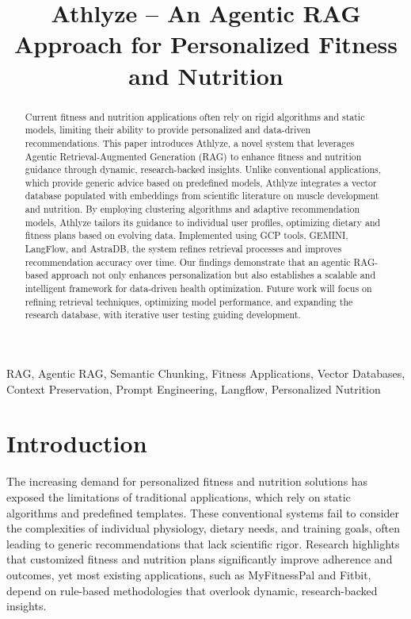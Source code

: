 \documentclass[conference]{IEEEtran}
\title{Athlyze – An Agentic RAG Approach for Personalized Fitness and Nutrition}
\author{
    \IEEEauthorblockN{Nishchay Patel}
    \IEEEauthorblockA{
        Department of Computer Science, \\ 
        Georgia State University,\\
        Atlanta, GA, USA\\
        \href{mailto:npatel237@student.gsu.edu}{npatel237@student.gsu.edu}
    }
}
\begin{document}
\maketitle

\begin{abstract}
Current fitness and nutrition applications often rely on rigid algorithms and static models, limiting their ability to provide personalized and data-driven recommendations. This paper introduces Athlyze, a novel system that leverages Agentic Retrieval-Augmented Generation (RAG) to enhance fitness and nutrition guidance through dynamic, research-backed insights. Unlike conventional applications, which provide generic advice based on predefined models, Athlyze integrates a vector database populated with embeddings from scientific literature on muscle development and nutrition. By employing clustering algorithms and adaptive recommendation models, Athlyze tailors its guidance to individual user profiles, optimizing dietary and fitness plans based on evolving data. Implemented using GCP tools, GEMINI, LangFlow, and AstraDB, the system refines retrieval processes and improves recommendation accuracy over time. Our findings demonstrate that an agentic RAG-based approach not only enhances personalization but also establishes a scalable and intelligent framework for data-driven health optimization. Future work will focus on refining retrieval techniques, optimizing model performance, and expanding the research database, with iterative user testing guiding development.\\
\end{abstract}

\renewcommand\IEEEkeywordsname{Keywords}
\begin{IEEEkeywords}
RAG, Agentic RAG, Semantic Chunking, Fitness Applications, Vector Databases, Context Preservation, Prompt Engineering, Langflow, Personalized Nutrition
\end{IEEEkeywords}

\section{Introduction}
The increasing demand for personalized fitness and nutrition solutions has exposed the limitations of traditional applications, which rely on static algorithms and predefined templates. These conventional systems fail to consider the complexities of individual physiology, dietary needs, and training goals, often leading to generic recommendations that lack scientific rigor. Research highlights that customized fitness and nutrition plans significantly improve adherence and outcomes, yet most existing applications, such as MyFitnessPal and Fitbit, depend on rule-based methodologies that overlook dynamic, research-backed insights.
\end{document}
